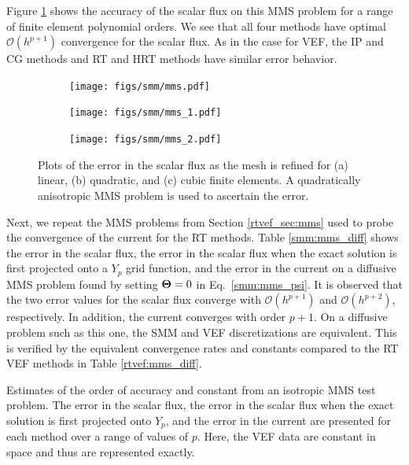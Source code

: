 \documentclass[../doc.tex]{subfiles}
\begin{document}
Figure \ref{smm:mms_fig} shows the accuracy of the scalar flux on this MMS problem for a range of finite element polynomial orders. We see that all four methods have optimal $\mathcal{O}(h^{p+1})$ convergence for the scalar flux. As in the case for VEF, the IP and CG methods and RT and HRT methods have similar error behavior. 
\begin{figure}
\centering
\begin{subfigure}{.4\textwidth}
	\centering
	\texttt{[image: figs/smm/mms.pdf]}
	\caption{}
\end{subfigure}
\begin{subfigure}{.4\textwidth}
	\centering
	\texttt{[image: figs/smm/mms\_1.pdf]}
	\caption{}
\end{subfigure}
\begin{subfigure}{.4\textwidth}
	\centering
	\texttt{[image: figs/smm/mms\_2.pdf]}
	\caption{}
\end{subfigure}
\caption{Plots of the error in the scalar flux as the mesh is refined for (a) linear, (b) quadratic, and (c) cubic finite elements. A quadratically anisotropic MMS problem is used to ascertain the error.}
\label{smm:mms_fig}
\end{figure}

Next, we repeat the MMS problems from Section \ref{rtvef_sec:mms} used to probe the convergence of the current for the RT methods. Table \ref{smm:mms_diff} shows the error in the scalar flux, the error in the scalar flux when the exact solution is first projected onto a $Y_p$ grid function, and the error in the current on a diffusive MMS problem found by setting $\boldsymbol{\mathrm{\Theta}} = 0$ in Eq.~\ref{smm:mms_psi}. It is observed that the two error values for the scalar flux converge with $\mathcal{O}(h^{p+1})$ and $\mathcal{O}(h^{p+2})$, respectively. In addition, the current converges with order $p+1$. On a diffusive problem such as this one, the SMM and VEF discretizations are equivalent. This is verified by the equivalent convergence rates and constants compared to the RT VEF methods in Table \ref{rtvef:mms_diff}. 
\begin{table}
\centering
\caption{Estimates of the order of accuracy and constant from an isotropic MMS test problem. The error in the scalar flux, the error in the scalar flux when the exact solution is first projected onto $Y_p$, and the error in the current are presented for each method over a range of values of $p$. Here, the VEF data are constant in space and thus are represented exactly.}
\label{smm:mms_diff}

\end{table}
\end{document}
